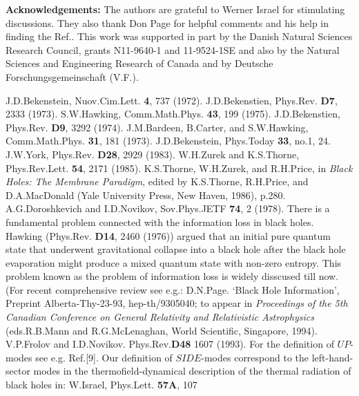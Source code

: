 \documentclass[superscriptaddress,showpacs,preprintnumbers,amsmath,amssymb,
nofootinbib,aps,prd,12pt]{revtex4-1}
\begin{document}
\vspace{1cm}

{\bf Acknowledgements:} The authors are grateful to Werner Israel for
stimulating discussions. They also thank Don Page for helpful comments
and his help in finding the Ref.\cite{Simk:86}.
This work was supported in part by
the Danish Natural Sciences Research Council, grants N11-9640-1 and
11-9524-1SE and also by the Natural Sciences and Engineering Research
of Canada and by Deutsche Forschungsgemeinschaft (V.F.).
\newpage

\begin{thebibliography}{99}

 J.D.Bekenstein, Nuov.Cim.Lett. {\bf 4}, 737 (1972).
 J.D.Bekenstien,  Phys.Rev. {\bf D7}, 2333 (1973).
 S.W.Hawking, Comm.Math.Phys. {\bf 43}, 199 (1975).
 J.D.Bekenstien,  Phys.Rev. {\bf D9}, 3292 (1974).
 J.M.Bardeen, B.Carter, and S.W.Hawking, Comm.Math.Phys.
{\bf 31}, 181 (1973).
 J.D.Bekenstein, Phys.Today {\bf 33}, no.1, 24.
 J.W.York, Phys.Rev. {\bf D28}, 2929 (1983).
 W.H.Zurek and K.S.Thorne, Phys.Rev.Lett. {\bf 54}, 2171
(1985).
 K.S.Thorne, W.H.Zurek, and R.H.Price, in {\em Black
Holes: The Membrane Paradigm}, edited by K.S.Thorne, R.H.Price, and
D.A.MacDonald (Yale University Press, New Haven, 1986), p.280.
 A.G.Doroshkevich and I.D.Novikov, Sov.Phys.JETF {\bf 74},
2 (1978).
 There is a fundamental problem connected with the information
loss in black holes. Hawking (Phys.Rev. {\bf D14}, 2460 (1976))
argued that an initial pure quantum state
that underwent gravitational collapse into a black hole after the
black hole evaporation might produce a mixed quantum state with non-zero
entropy. This problem known as the problem of information loss is
widely disscused till now. (For recent comprehensive review see e.g.:
D.N.Page. `Black Hole Information', Preprint Alberta-Thy-23-93,
hep-th/9305040;
to appear in {\em Proceedings of the 5th Canadian Conference on General
Relativity and Relativistic Astrophysics} (eds.R.B.Mann and R.G.McLenaghan,
World
Scientific, Singapore, 1994).
 V.P.Frolov and I.D.Novikov. Phys.Rev.{\bf D48} 1607 (1993).
 For the definition of $UP$-modes see e.g. Ref.[9]. Our
definition of $SIDE$-modes correspond to the left-hand-sector
modes in the thermofield-dynamical description of the thermal
radiation of black holes in: W.Israel, Phys.Lett. {\bf 57A}, 107

\end{thebibliography}
\end{document}
